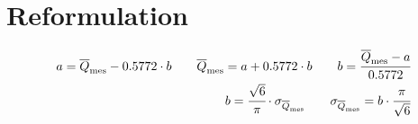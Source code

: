 \section{Reformulation}
\begin{eqnarray*}
    a = \overline{Q}_\text{mes} - 0.5772 \cdot b                      \qquad  \overline{Q}_\text{mes} = a + 0.5772 \cdot b  \qquad  b = \cfrac{\overline{Q}_\text{mes} - a}{0.5772} \\
    b = \cfrac{\sqrt{6}}{\pi} \cdot \sigma_{\overline{Q}_\text{mes}}  \qquad  \sigma_{\overline{Q}_\text{mes}} = b \cdot \cfrac{\pi}{\sqrt{6}}                  \\
\end{eqnarray*}